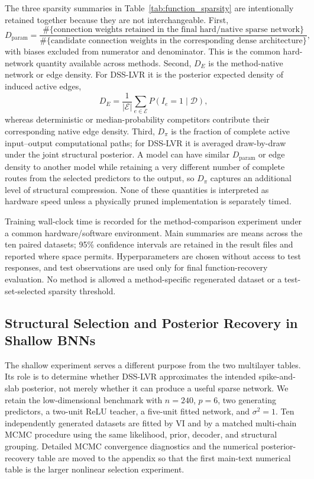 The three sparsity summaries in Table~\ref{tab:function_sparsity} are intentionally retained together because they are not interchangeable. First,
\[
D_{\mathrm{param}}=
\frac{\#\{\text{connection weights retained in the final hard/native sparse network}\}}
{\#\{\text{candidate connection weights in the corresponding dense architecture}\}},
\]
with biases excluded from numerator and denominator. This is the common hard-network quantity available across methods. Second, $D_E$ is the method-native network or edge density. For DSS-LVR it is the posterior expected density of induced active edges,
\[
D_E=\frac{1}{|\mathcal E|}\sum_{e\in\mathcal E}P(I_e=1\mid\mathcal D),
\]
whereas deterministic or median-probability competitors contribute their corresponding native edge density. Third, $D_\pi$ is the fraction of complete active input--output computational paths; for DSS-LVR it is averaged draw-by-draw under the joint structural posterior. A model can have similar $D_{\mathrm{param}}$ or edge density to another model while retaining a very different number of complete routes from the selected predictors to the output, so $D_\pi$ captures an additional level of structural compression. None of these quantities is interpreted as hardware speed unless a physically pruned implementation is separately timed.

Training wall-clock time is recorded for the method-comparison experiment under a common hardware/software environment. Main summaries are means across the ten paired datasets; 95\% confidence intervals are retained in the result files and reported where space permits. Hyperparameters are chosen without access to test responses, and test observations are used only for final function-recovery evaluation. No method is allowed a method-specific regenerated dataset or a test-set-selected sparsity threshold.

\subsection{Structural Selection and Posterior Recovery in Shallow BNNs}
\label{sec:shallow_exp}

The shallow experiment serves a different purpose from the two multilayer tables. Its role is to determine whether DSS-LVR approximates the intended spike-and-slab posterior, not merely whether it can produce a useful sparse network. We retain the low-dimensional benchmark with $n=240$, $p=6$, two generating predictors, a two-unit ReLU teacher, a five-unit fitted network, and $\sigma^2=1$. Ten independently generated datasets are fitted by VI and by a matched multi-chain MCMC procedure using the same likelihood, prior, decoder, and structural grouping. Detailed MCMC convergence diagnostics and the numerical posterior-recovery table are moved to the appendix so that the first main-text numerical table is the larger nonlinear selection experiment.

